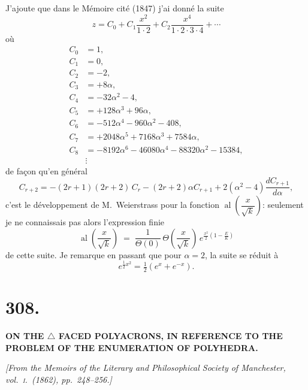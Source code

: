 \documentclass[11pt,a4paper]{article}
\providecommand{\al}{\mathop{\mathrm{al}}\nolimits}
\begin{document}
J'ajoute que dans le M\'{e}moire cit\'{e} (1847) j'ai donn\'{e} la suite
\[
z=C_0+C_1\frac{x^2}{1\cdot 2}+C_2\frac{x^4}{1\cdot 2\cdot 3\cdot 4}+\cdots
\]
o\`{u}
\begin{align*}
C_0 &= 1,\\
C_1 &= 0,\\
C_2 &= -2,\\
C_3 &= +8\alpha,\\
C_4 &= -32\alpha^2-4,\\
C_5 &= +128\alpha^3+96\alpha,\\
C_6 &= -512\alpha^4-960\alpha^2-408,\\
C_7 &= +2048\alpha^5+7168\alpha^3+7584\alpha,\\
C_8 &= -8192\alpha^6-46080\alpha^4-88320\alpha^2-15384,\\
&\vdots
\end{align*}
de fa\c{c}on qu'en g\'{e}n\'{e}ral
\[
C_{r+2}=-(2r+1)(2r+2)\,C_r-(2r+2)\alpha C_{r+1}+2(\alpha^2-4)\frac{dC_{r+1}}{d\alpha},
\]
c'est le d\'{e}veloppement de M.~Weierstrass pour la fonction $\al\!\left(\dfrac{x}{\sqrt{k}}\right)$: seulement je ne connaissais pas alors l'expression finie
\[
\al\!\left(\frac{x}{\sqrt{k}}\right)\;=\;\frac{1}{\Theta(0)}\,\Theta\!\left(\frac{x}{\sqrt{k}}\right)\,e^{\tfrac{x^2}{2}\left(1-\tfrac{E}{K}\right)}
\]
de cette suite. Je remarque en passant que pour $\alpha=2$, la suite se r\'{e}duit \`{a}
\[
e^{\frac{1}{2}x^2}=\tfrac{1}{2}(e^x+e^{-x}).
\]

\bigskip

\section*{308.}

\begin{center}
\textbf{ON THE $\triangle$ FACED POLYACRONS, IN REFERENCE TO THE PROBLEM OF THE ENUMERATION OF POLYHEDRA.}
\end{center}

\bigskip

\noindent\textit{[From the Memoirs of the Literary and Philosophical Society of Manchester, vol.\ \textsc{i}.\ (1862), pp.\ 248--256.]}

\bigskip
\end{document}
